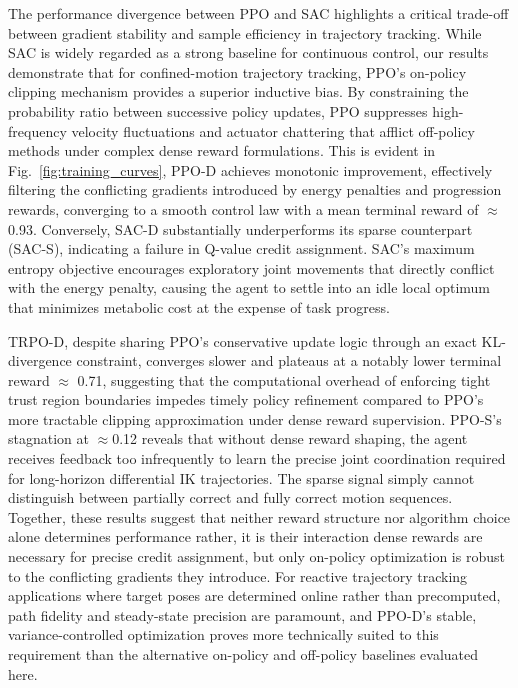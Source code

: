 \documentclass[preprint,12pt]{elsarticle}
\begin{document}
The performance divergence between PPO and SAC highlights a critical trade-off between gradient stability and sample efficiency in trajectory tracking. While SAC is widely regarded as a strong baseline for continuous control, our results demonstrate that for confined-motion trajectory tracking, PPO's on-policy clipping mechanism provides a superior inductive bias. By constraining the probability ratio between successive policy updates, PPO suppresses high-frequency velocity fluctuations and actuator chattering that afflict off-policy methods under complex dense reward formulations. This is evident in Fig.~\ref{fig:training_curves}, PPO-D achieves monotonic improvement, effectively filtering the conflicting gradients introduced by energy penalties and progression rewards, converging to a smooth control law with a mean terminal reward of $\approx$ 0.93. Conversely, SAC-D substantially underperforms its sparse counterpart (SAC-S), indicating a failure in Q-value credit assignment. SAC's maximum entropy objective encourages exploratory joint movements that directly conflict with the energy penalty, causing the agent to settle into an idle local optimum that minimizes metabolic cost at the expense of task progress. 

TRPO-D, despite sharing PPO's conservative update logic through an exact KL-divergence constraint, converges slower and plateaus at a notably lower terminal reward $\approx$ 0.71, suggesting that the computational overhead of enforcing tight trust region boundaries impedes timely policy refinement compared to PPO's more tractable clipping approximation under dense reward supervision. PPO-S's stagnation at $\approx$0.12 reveals that without dense reward shaping, the agent receives feedback too infrequently to learn the precise joint coordination required for long-horizon differential IK trajectories. The sparse signal simply cannot distinguish between partially correct and fully correct motion sequences. Together, these results suggest that neither reward structure nor algorithm choice alone determines performance rather, it is their interaction dense rewards are necessary for precise credit assignment, but only on-policy optimization is robust to the conflicting gradients they introduce. For reactive trajectory tracking applications where target poses are determined online rather than precomputed, path fidelity and steady-state precision are paramount, and PPO-D's stable, variance-controlled optimization proves more technically suited to this requirement than the alternative on-policy and off-policy baselines evaluated here.
\end{document}
